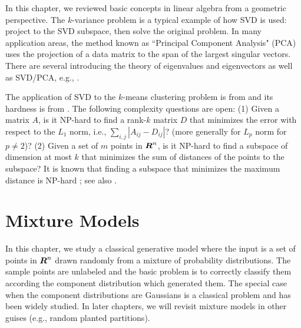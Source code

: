 \documentclass{book}
\numberwithin{exercise}{chapter}
\begin{document}

In this chapter, we reviewed basic concepts in linear algebra from a geometric perspective. The $k$-variance problem is a typical example of how SVD is used: project to the SVD subspace, then solve the original problem. In many application areas, the method known as ``Principal Component Analysis" (PCA) uses the projection of a data matrix to the span of the largest singular vectors. There are several introducing the theory of eigenvalues and eigenvectors as well as SVD/PCA, e.g., \cite{GolubVanLoan, Strang, bhatia}.

The application of SVD to the $k$-means clustering problem is from \cite{DFKVV04} and its hardness is from \cite{DP09}.
The following complexity questions are open:
(1) Given a matrix $A$, is it NP-hard to find a rank-$k$ matrix $D$ that minimizes the error with respect to the $L_1$ norm, i.e., $\sum_{i,j} |A_{ij} - D_{ij}|$? (more generally for $L_p$ norm for $p \neq 2$)?
(2) Given a set of $m$ points in $\mbox{\mbox{\boldmath $R$}}^n$, is it NP-hard to find a subspace of dimension at most $k$ that minimizes the sum of distances of the points to the subspace?
It is known that finding a subspace that minimizes the maximum distance is NP-hard \cite{Megiddo1982}; see also \cite{HV02}.






\chapter{Mixture Models}\label{chap:mixtures}

In this chapter, we study a classical generative model where the input is a set of points in $\mbox{\mbox{\boldmath $R$}}^n$ drawn randomly from a mixture of probability distributions. The sample points are unlabeled and the basic problem is to correctly classify them according the component distribution which generated them. The special case when the component distributions are Gaussians is a classical problem and has been widely studied. In later chapters, we will revisit
mixture models in other guises (e.g., random planted partitions).
\end{document}
